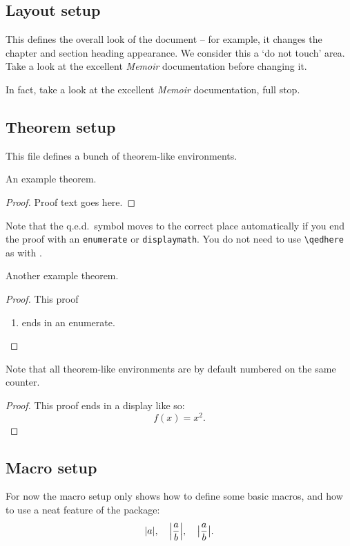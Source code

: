 \subsection{Layout setup}

This defines the overall look of the document -- for example, it
changes the chapter and section heading appearance.  We consider this
a `do not touch' area.  Take a look at the excellent \emph{Memoir}
documentation before changing it.

In fact, take a look at the excellent \emph{Memoir} documentation,
full stop.


\subsection{Theorem setup}

This file defines a bunch of theorem-like environments.

\begin{theorem}
  An example theorem.
\end{theorem}

\begin{proof}
  Proof text goes here.
\end{proof}

Note that the q.e.d.\ symbol moves to the correct place automatically
if you end the proof with an \texttt{enumerate} or
\texttt{displaymath}.  You do not need to use \verb-\qedhere- as with
.

\begin{theorem}
  Another example theorem.
\end{theorem}

\begin{proof}
  This proof
  \begin{enumerate}
  \item ends in an enumerate.
  \end{enumerate}
\end{proof}

\begin{proposition}
  Note that all theorem-like environments are by default numbered on
  the same counter.
\end{proposition}

\begin{proof}
  This proof ends in a display like so:
  \begin{displaymath}
    f(x) = x^2.
  \end{displaymath}
\end{proof}


\subsection{Macro setup}

For now the macro setup only shows how to define some basic macros,
and how to use a neat feature of the  package:
\begin{displaymath}
  \abs{a}, \quad \abs*{\frac{a}{b}}, \quad \abs[\big]{\frac{a}{b}}.
\end{displaymath}
